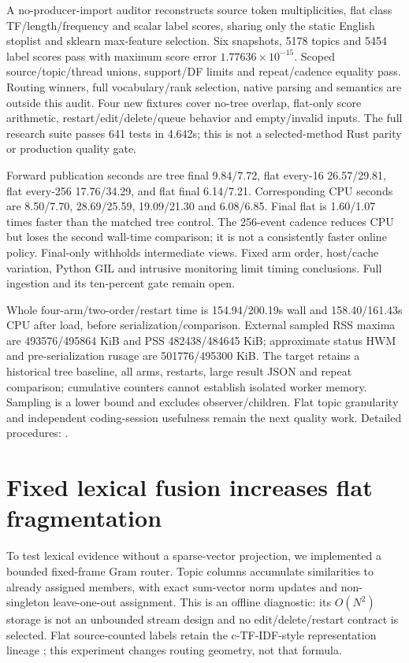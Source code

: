\documentclass[11pt]{article}
\begin{document}
A no-producer-import auditor reconstructs source token multiplicities, flat
class TF/length/frequency and scalar label scores, sharing only the static
English stoplist and sklearn max-feature selection. Six snapshots, 5178 topics
and 5454 label scores pass with maximum score error $1.77636\times10^{-15}$.
Scoped source/topic/thread unions, support/DF limits and repeat/cadence equality
pass. Routing winners, full vocabulary/rank selection, native parsing and
semantics are outside this audit. Four new fixtures cover no-tree overlap,
flat-only score arithmetic, restart/edit/delete/queue behavior and empty/invalid
inputs. The full research suite passes 641 tests in 4.642s; this is not a
selected-method Rust parity or production quality gate.

Forward publication seconds are tree final 9.84/7.72, flat every-16
26.57/29.81, flat every-256 17.76/34.29, and flat final 6.14/7.21.
Corresponding CPU seconds are 8.50/7.70, 28.69/25.59, 19.09/21.30 and
6.08/6.85. Final flat is 1.60/1.07 times faster than the matched tree control.
The 256-event cadence reduces CPU but loses the second wall-time comparison;
it is not a consistently faster online policy. Final-only withholds intermediate
views. Fixed arm order, host/cache variation, Python GIL and intrusive monitoring
limit timing conclusions. Full ingestion and its ten-percent gate remain open.

Whole four-arm/two-order/restart time is 154.94/200.19s wall and
158.40/161.43s CPU after load, before serialization/comparison. External sampled
RSS maxima are 493576/495864 KiB and PSS 482438/484645 KiB; approximate
status HWM and pre-serialization rusage are 501776/495300 KiB. The target
retains a historical tree baseline, all arms, restarts, large result JSON and
repeat comparison; cumulative counters cannot establish isolated worker memory.
Sampling is a lower bound and excludes observer/children. Flat topic granularity
and independent coding-session usefulness remain the next quality work.
Detailed procedures: .

\section{Fixed lexical fusion increases flat fragmentation}
To test lexical evidence without a sparse-vector projection, we implemented a
bounded fixed-frame Gram router. Topic columns accumulate similarities to
already assigned members, with exact sum-vector norm updates and non-singleton
leave-one-out assignment. This is an offline diagnostic: its $O(N^2)$ storage
is not an unbounded stream design and no edit/delete/restart contract is selected.
Flat source-counted labels retain the c-TF-IDF-style representation lineage
\cite{bertopic}; this experiment changes routing geometry, not that formula.
\end{document}
